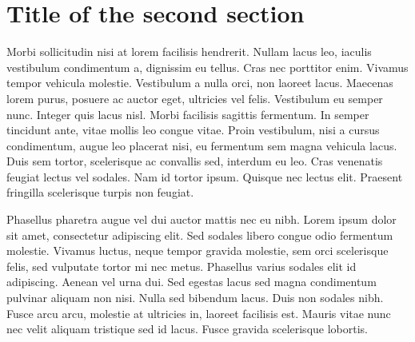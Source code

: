 \section{Title of the second section}

Morbi sollicitudin nisi at lorem facilisis hendrerit. Nullam lacus
leo, iaculis vestibulum condimentum a, dignissim eu tellus. Cras nec
porttitor enim. Vivamus tempor vehicula molestie. Vestibulum a nulla
orci, non laoreet lacus. Maecenas lorem purus, posuere ac auctor eget,
ultricies vel felis. Vestibulum eu semper nunc. Integer quis lacus
nisl. Morbi facilisis sagittis fermentum. In semper tincidunt ante,
vitae mollis leo congue vitae. Proin vestibulum, nisi a cursus
condimentum, augue leo placerat nisi, eu fermentum sem magna vehicula
lacus. Duis sem tortor, scelerisque ac convallis sed, interdum eu
leo. Cras venenatis feugiat lectus vel sodales. Nam id tortor
ipsum. Quisque nec lectus elit. Praesent fringilla scelerisque turpis
non feugiat.

Phasellus pharetra augue vel dui auctor mattis nec eu nibh. Lorem
ipsum dolor sit amet, consectetur adipiscing elit. Sed sodales libero
congue odio fermentum molestie. Vivamus luctus, neque tempor gravida
molestie, sem orci scelerisque felis, sed vulputate tortor mi nec
metus. Phasellus varius sodales elit id adipiscing. Aenean vel urna
dui. Sed egestas lacus sed magna condimentum pulvinar aliquam non
nisi. Nulla sed bibendum lacus. Duis non sodales nibh. Fusce arcu
arcu, molestie at ultricies in, laoreet facilisis est. Mauris vitae
nunc nec velit aliquam tristique sed id lacus. Fusce gravida
scelerisque lobortis.


